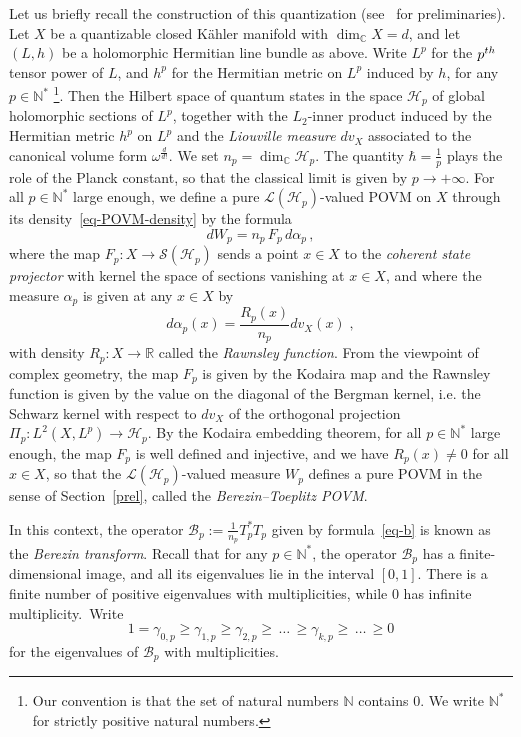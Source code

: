 \documentclass[11pt]{article}
\theoremstyle{definition}
\numberwithin{equation}{section}
\numberwithin{figure}{section}
\numberwithin{table}{section}
\newcommand{\R}{{\mathbb{R}}}
\newcommand{\N}{{\mathbb{N}}}
\newcommand{\CCC}{{\mathbb{C}}}
\newcommand{\cB}{{\mathcal{B}}}
\newcommand{\cH}{{\mathcal{H}}}
\newcommand{\cS}{{\mathcal{S}}}
\newcommand{\Hilb}{\mathcal{H}}
\renewcommand\geq {\geqslant}
\newcommand\< {\mathcal{h}}
\renewcommand\> {\mathcal{i}}
\newcommand*\cL{\mathscr{L}}
\begin{document}
Let us briefly recall the construction of this quantization (see~\cite{BMS,LF,S} for preliminaries). Let $X$ be a quantizable closed K\"ahler manifold with $\dim_\CCC X=d$, and let $(L,h)$ be a holomorphic Hermitian line bundle as above. Write $L^p$ for the $p^{\rm th}$ tensor power of $L$, and $h^p$ for the Hermitian metric on $L^p$ induced by $h$, for any $p\in\N^*$
\footnote{Our convention is that the set of natural numbers $\N$ contains $0$. We write $\N^*$ for strictly positive natural numbers.}. Then the Hilbert space of quantum states in the space $\Hilb_p$ of global holomorphic sections of $L^p$, together with the $L_2$-inner product induced by the Hermitian metric $h^p$ on $L^p$ and the \emph{Liouville measure} $dv_X$ associated to the canonical volume form $\omega^\frac{d}{d!}$. We set $n_p=\dim_\CCC\cH_p$. The quantity $\hbar=\frac{1}{p}$ plays the role of the Planck constant, so that the classical limit is given by $p \to +\infty$. For all $p\in\N^*$ large enough, we define a pure $\cL(\Hilb_p)$-valued POVM on $X$ through its density~\eqref{eq-POVM-density} by the formula
\begin{equation}\label{BTPOVM}
dW_{p} = n_p\,F_p\,d\alpha_p\,,
\end{equation}
where the map $F_p: X\to \cS(\Hilb_p)$ sends a point $x \in X$ to the \emph{coherent state projector} with kernel the space of sections vanishing at $x\in X$, and where the measure $\alpha_p$ is given at any $x\in X$ by
\begin{equation}\label{eq-alphahbar}
d\alpha_p(x) = \frac{R_p(x)}{n_p}dv_X(x)\;,
\end{equation}
with density $R_p : X \to \R$ called the
\emph{Rawnsley function}. From the viewpoint of complex geometry, the map $F_p$ is given by the Kodaira map and the Rawnsley function is given by the value on the diagonal of the Bergman kernel, i.e. the Schwarz kernel with respect to $dv_X$ of the orthogonal projection $\Pi_p:L^2(X,L^p)\rightarrow\cH_p$. By the Kodaira embedding theorem, for all $p\in\N^*$ large enough, the map $F_p$ is well defined and injective, and we have $R_p(x)\neq 0$ for all $x\in X$, so that the $\cL(\Hilb_p)$-valued measure $W_p$ defines a pure POVM in the sense of Section~\ref{prel}, called the \emph{Berezin--Toeplitz POVM}.

In this context, the operator $\cB_p:= \frac{1}{n_p} T^*_p T_p$ given by formula~\eqref{eq-b} is known as the \emph{Berezin transform}. Recall that for any $p\in\N^*$, the operator $\cB_p$ has a finite-dimensional image, and all its eigenvalues lie in the interval $[0,1]$. There is a finite number of positive eigenvalues with multiplicities,
while $0$ has infinite multiplicity.~Write
\[
1=\gamma_{0,p}
\geq \gamma_{1,p} \geq \gamma_{2,p}\geq\,\dots\,\geq \gamma_{k,p} \geq\,\dots\,\geq 0
\]
for the eigenvalues of $\cB_p$ with multiplicities.
\end{document}
